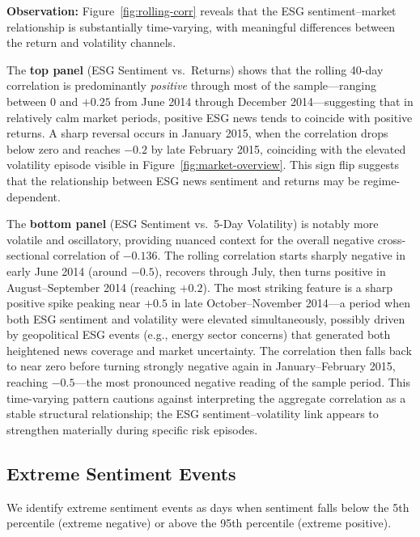 \documentclass[12pt,a4paper]{article}
\begin{document}
\textbf{Observation:} Figure~\ref{fig:rolling-corr} reveals that the ESG sentiment--market relationship is substantially time-varying, with meaningful differences between the return and volatility channels.

The \textbf{top panel} (ESG Sentiment vs.\ Returns) shows that the rolling 40-day correlation is predominantly \emph{positive} through most of the sample---ranging between $0$ and $+0.25$ from June 2014 through December 2014---suggesting that in relatively calm market periods, positive ESG news tends to coincide with positive returns. A sharp reversal occurs in January 2015, when the correlation drops below zero and reaches $-0.2$ by late February 2015, coinciding with the elevated volatility episode visible in Figure~\ref{fig:market-overview}. This sign flip suggests that the relationship between ESG news sentiment and returns may be regime-dependent.

The \textbf{bottom panel} (ESG Sentiment vs.\ 5-Day Volatility) is notably more volatile and oscillatory, providing nuanced context for the overall negative cross-sectional correlation of $-0.136$. The rolling correlation starts sharply negative in early June 2014 (around $-0.5$), recovers through July, then turns positive in August--September 2014 (reaching $+0.2$). The most striking feature is a sharp positive spike peaking near $+0.5$ in late October--November 2014---a period when both ESG sentiment and volatility were elevated simultaneously, possibly driven by geopolitical ESG events (e.g., energy sector concerns) that generated both heightened news coverage and market uncertainty. The correlation then falls back to near zero before turning strongly negative again in January--February 2015, reaching $-0.5$---the most pronounced negative reading of the sample period. This time-varying pattern cautions against interpreting the aggregate correlation as a stable structural relationship; the ESG sentiment--volatility link appears to strengthen materially during specific risk episodes.

\subsection{Extreme Sentiment Events}
\label{subsec:extreme-events}

We identify extreme sentiment events as days when sentiment falls below the 5th percentile (extreme negative) or above the 95th percentile (extreme positive).
\end{document}
